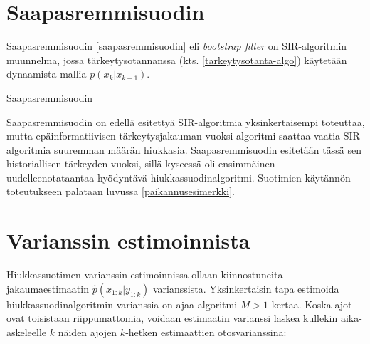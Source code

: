 \documentclass[
  12pt,
  a4paper, twoside]{book}
\begin{document}
\section{Saapasremmisuodin}

Saapasremmisuodin \ref{saapasremmisuodin} eli \emph{bootstrap filter} on SIR-algoritmin muunnelma, jossa tärkeytysotannanssa (kts. \ref{tarkeytysotanta-algo}) käytetään dynaamista mallia \(p(x_k|x_{k-1})\).

\begin{algorithm}[H]
\label{saapasremmisuodin}
\DontPrintSemicolon
\SetAlgoShortEnd
{}
\caption{Saapasremmisuodin}
\end{algorithm}

Saapasremmisuodin on edellä esitettyä SIR-algoritmia yksinkertaisempi toteuttaa, mutta epäinformatiivisen tärkeytysjakauman vuoksi algoritmi saattaa vaatia SIR-algoritmia suuremman määrän hiukkasia. Saapasremmisuodin esitetään tässä sen historiallisen tärkeyden vuoksi, sillä kyseessä oli ensimmäinen uudelleenotataantaa hyödyntävä hiukkassuodinalgoritmi. Suotimien käytännön toteutukseen palataan luvussa \ref{paikannusesimerkki}.

\section{Varianssin estimoinnista} \label{varianssin-estimointi}

Hiukkassuotimen varianssin estimoinnissa ollaan kiinnostuneita jakaumaestimaatin \(\hat{p}(x_{1:k}|y_{1:k})\) varianssista. Yksinkertaisin tapa estimoida hiukkassuodinalgoritmin varianssia on ajaa algoritmi \(M > 1\) kertaa. Koska ajot ovat toisistaan riippumattomia, voidaan estimaatin varianssi laskea kullekin aika-askeleelle \(k\) näiden ajojen \(k\)-hetken estimaattien otosvarianssina:
\end{document}
